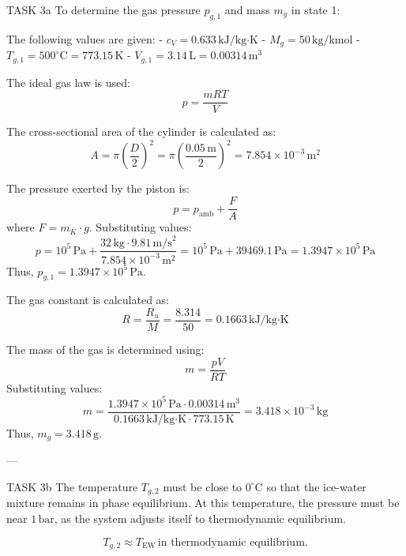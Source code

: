 TASK 3a  
To determine the gas pressure \( p_{g,1} \) and mass \( m_g \) in state 1:  

The following values are given:  
- \( c_V = 0.633 \, \text{kJ/kg·K} \)  
- \( M_g = 50 \, \text{kg/kmol} \)  
- \( T_{g,1} = 500^\circ\text{C} = 773.15 \, \text{K} \)  
- \( V_{g,1} = 3.14 \, \text{L} = 0.00314 \, \text{m}^3 \)  

The ideal gas law is used:  
\[
p = \frac{mRT}{V}
\]  

The cross-sectional area of the cylinder is calculated as:  
\[
A = \pi \left(\frac{D}{2}\right)^2 = \pi \left(\frac{0.05 \, \text{m}}{2}\right)^2 = 7.854 \times 10^{-3} \, \text{m}^2
\]  

The pressure exerted by the piston is:  
\[
p = p_{\text{amb}} + \frac{F}{A}
\]  
where \( F = m_K \cdot g \). Substituting values:  
\[
p = 10^5 \, \text{Pa} + \frac{32 \, \text{kg} \cdot 9.81 \, \text{m/s}^2}{7.854 \times 10^{-3} \, \text{m}^2} = 10^5 \, \text{Pa} + 39469.1 \, \text{Pa} = 1.3947 \times 10^5 \, \text{Pa}
\]  
Thus, \( p_{g,1} = 1.3947 \times 10^5 \, \text{Pa} \).  

The gas constant is calculated as:  
\[
R = \frac{R_u}{M} = \frac{8.314}{50} = 0.1663 \, \text{kJ/kg·K}
\]  

The mass of the gas is determined using:  
\[
m = \frac{pV}{RT}
\]  
Substituting values:  
\[
m = \frac{1.3947 \times 10^5 \, \text{Pa} \cdot 0.00314 \, \text{m}^3}{0.1663 \, \text{kJ/kg·K} \cdot 773.15 \, \text{K}} = 3.418 \times 10^{-3} \, \text{kg}
\]  
Thus, \( m_g = 3.418 \, \text{g} \).  

---

TASK 3b  
The temperature \( T_{g,2} \) must be close to \( 0^\circ\text{C} \) so that the ice-water mixture remains in phase equilibrium. At this temperature, the pressure must be near \( 1 \, \text{bar} \), as the system adjusts itself to thermodynamic equilibrium.  

\[
T_{g,2} \approx T_{\text{EW}} \, \text{in thermodynamic equilibrium}.
\]